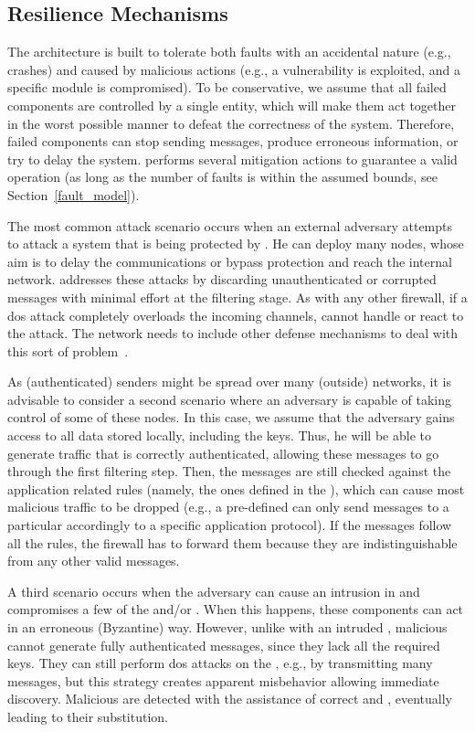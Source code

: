\subsection{Resilience Mechanisms}


The \sieveq architecture is built to tolerate both faults with an accidental nature (e.g., crashes) and caused by malicious actions (e.g., a vulnerability is exploited, and a specific module is compromised).
To be conservative, we assume that all failed components are controlled by a single entity, which will make them act together in the worst possible manner to defeat the correctness of the system. Therefore, failed components can stop sending messages, produce erroneous information, or try to delay the system. 
\sieveq performs several mitigation actions to guarantee a valid operation (as long as the number of faults is within the assumed bounds, see Section~\ref{fault_model}).


The most common attack scenario occurs when an external adversary attempts to attack a system that is being protected by \sieveq. 
He can deploy many nodes, whose aim is to delay the communications or bypass \sieveq protection and reach the internal network. \sieveq addresses these attacks by discarding unauthenticated or corrupted messages with minimal effort at the \presieve filtering stage.
As with any other firewall, if a \gls{dos} attack completely overloads the incoming channels, \sieveq cannot handle or react to the attack.
The network needs to include other defense mechanisms to deal with this sort of problem~\cite{Mishra:2011}.

As (authenticated) senders might be spread over many (outside) networks, it is advisable to consider a second scenario where an adversary is capable of taking control of some of these nodes. 
In this case, we assume that the adversary gains access to all data stored locally, including the \sender keys. 
Thus, he will be able to generate traffic that is correctly authenticated, allowing these messages to go through the first filtering step.
Then, the messages are still checked against the application related rules (namely, the ones defined in the \repsieve), which can cause most malicious traffic to be dropped (e.g., a pre-defined \sender can only send messages to a particular \postsieve accordingly to a specific application protocol).
If the messages follow all the rules, the firewall has to forward them because they are indistinguishable from any other valid messages.


A third scenario occurs when the adversary can cause an intrusion in \sieveq and compromises a few of the \presieves and/or \repsieves. 
When this happens, these components can act in an erroneous (Byzantine) way. 
However, unlike with an intruded \sender, malicious \presieves cannot generate fully authenticated messages, since they lack all the required keys. 
They can still perform \gls{dos} attacks on the \repsieves, e.g., by transmitting many messages, but this strategy creates apparent misbehavior allowing immediate discovery. 
Malicious \presieves are detected with the assistance of correct \sender and \repsieves, eventually leading to their substitution.

